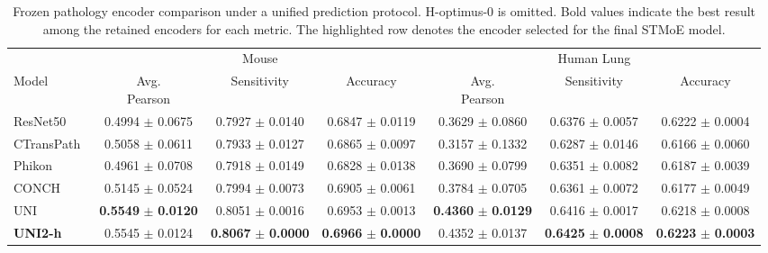 \documentclass[sigconf]{acmart}
\newcommand{\method}{STMoE\xspace}
\begin{document}
\begin{table}[t]
\centering
\small
\setlength{\tabcolsep}{5pt}
\renewcommand{\arraystretch}{1.18}
\caption{Frozen pathology encoder comparison under a unified prediction protocol. H-optimus-0 is omitted. Bold values indicate the best result among the retained encoders for each metric. The highlighted row denotes the encoder selected for the final \method{} model.}
\label{tab:encoder_scaling}
\begin{tabular*}{\textwidth}{@{\extracolsep{\fill}}lcccccc@{}}
\toprule
& \multicolumn{3}{c}{Mouse} & \multicolumn{3}{c}{Human Lung} \\
\cmidrule(lr){2-4}
\cmidrule(lr){5-7}
Model &
\makecell{Avg.\\Pearson} &
Sensitivity &
Accuracy &
\makecell{Avg.\\Pearson} &
Sensitivity &
Accuracy \\
\midrule
ResNet50~\cite{he2016deep} &
0.4994 $\pm$ 0.0675 &
0.7927 $\pm$ 0.0140 &
0.6847 $\pm$ 0.0119 &
0.3629 $\pm$ 0.0860 &
0.6376 $\pm$ 0.0057 &
0.6222 $\pm$ 0.0004 \\

CTransPath~\cite{wang2022ctranspath} &
0.5058 $\pm$ 0.0611 &
0.7933 $\pm$ 0.0127 &
0.6865 $\pm$ 0.0097 &
0.3157 $\pm$ 0.1332 &
0.6287 $\pm$ 0.0146 &
0.6166 $\pm$ 0.0060 \\

Phikon~\cite{filiot2024phikon} &
0.4961 $\pm$ 0.0708 &
0.7918 $\pm$ 0.0149 &
0.6828 $\pm$ 0.0138 &
0.3690 $\pm$ 0.0799 &
0.6351 $\pm$ 0.0082 &
0.6187 $\pm$ 0.0039 \\

CONCH~\cite{lu2024conch} &
0.5145 $\pm$ 0.0524 &
0.7994 $\pm$ 0.0073 &
0.6905 $\pm$ 0.0061 &
0.3784 $\pm$ 0.0705 &
0.6361 $\pm$ 0.0072 &
0.6177 $\pm$ 0.0049 \\

UNI~\cite{chen2024uni} &
\textbf{0.5549} $\pm$ \textbf{0.0120} &
0.8051 $\pm$ 0.0016 &
0.6953 $\pm$ 0.0013 &
\textbf{0.4360} $\pm$ \textbf{0.0129} &
0.6416 $\pm$ 0.0017 &
0.6218 $\pm$ 0.0008 \\

\rowcolor{blue!8}
\textbf{UNI2-h}~\cite{chen2024uni} &
0.5545 $\pm$ 0.0124 &
\textbf{0.8067} $\pm$ \textbf{0.0000} &
\textbf{0.6966} $\pm$ \textbf{0.0000} &
0.4352 $\pm$ 0.0137 &
\textbf{0.6425} $\pm$ \textbf{0.0008} &
\textbf{0.6223} $\pm$ \textbf{0.0003} \\
\bottomrule
\end{tabular*}
\end{table}
\end{document}
